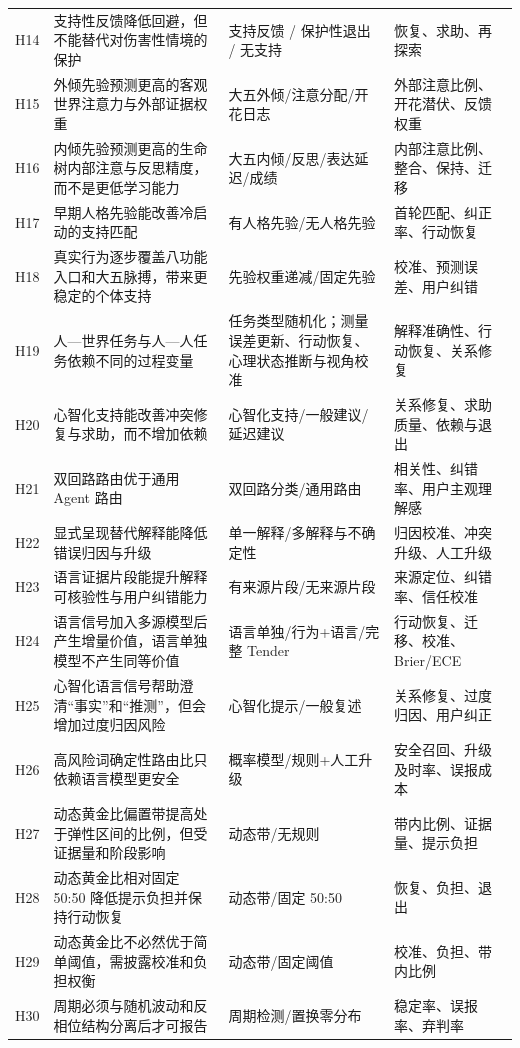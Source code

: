 \documentclass[UTF8,a4paper,11pt]{ctexart}
\begin{document}
\begin{center}
\begin{longtable}{@{}p{1.4cm}p{4.5cm}p{5.2cm}p{3.4cm}@{}}
H14 & 支持性反馈降低回避，但不能替代对伤害性情境的保护 & 支持反馈 / 保护性退出 / 无支持 & 恢复、求助、再探索 \\
H15 & 外倾先验预测更高的客观世界注意力与外部证据权重 & 大五外倾/注意分配/开花日志 & 外部注意比例、开花潜伏、反馈权重 \\
H16 & 内倾先验预测更高的生命树内部注意与反思精度，而不是更低学习能力 & 大五内倾/反思/表达延迟/成绩 & 内部注意比例、整合、保持、迁移 \\
H17 & 早期人格先验能改善冷启动的支持匹配 & 有人格先验/无人格先验 & 首轮匹配、纠正率、行动恢复 \\
H18 & 真实行为逐步覆盖八功能入口和大五脉搏，带来更稳定的个体支持 & 先验权重递减/固定先验 & 校准、预测误差、用户纠错 \\
H19 & 人—世界任务与人—人任务依赖不同的过程变量 & 任务类型随机化；测量误差更新、行动恢复、心理状态推断与视角校准 & 解释准确性、行动恢复、关系修复 \\
H20 & 心智化支持能改善冲突修复与求助，而不增加依赖 & 心智化支持/一般建议/延迟建议 & 关系修复、求助质量、依赖与退出 \\
H21 & 双回路路由优于通用 Agent 路由 & 双回路分类/通用路由 & 相关性、纠错率、用户主观理解感 \\
H22 & 显式呈现替代解释能降低错误归因与升级 & 单一解释/多解释与不确定性 & 归因校准、冲突升级、人工升级 \\
H23 & 语言证据片段能提升解释可核验性与用户纠错能力 & 有来源片段/无来源片段 & 来源定位、纠错率、信任校准 \\
H24 & 语言信号加入多源模型后产生增量价值，语言单独模型不产生同等价值 & 语言单独/行为+语言/完整 Tender & 行动恢复、迁移、校准、Brier/ECE \\
H25 & 心智化语言信号帮助澄清“事实”和“推测”，但会增加过度归因风险 & 心智化提示/一般复述 & 关系修复、过度归因、用户纠正 \\
H26 & 高风险词确定性路由比只依赖语言模型更安全 & 概率模型/规则+人工升级 & 安全召回、升级及时率、误报成本 \\
H27 & 动态黄金比偏置带提高处于弹性区间的比例，但受证据量和阶段影响 & 动态带/无规则 & 带内比例、证据量、提示负担 \\
H28 & 动态黄金比相对固定 50:50 降低提示负担并保持行动恢复 & 动态带/固定 50:50 & 恢复、负担、退出 \\
H29 & 动态黄金比不必然优于简单阈值，需披露校准和负担权衡 & 动态带/固定阈值 & 校准、负担、带内比例 \\
H30 & 周期必须与随机波动和反相位结构分离后才可报告 & 周期检测/置换零分布 & 稳定率、误报率、弃判率 \\

\end{longtable}
\end{center}
\end{document}
